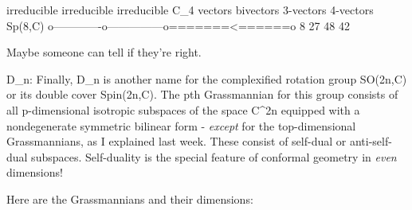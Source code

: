                            irreducible     irreducible    irreducible
C_{4}              vectors     bivectors       3-vectors      4-vectors
Sp(8,C)          o-------------o---------------o=======<======o
                 8            27              48             42
$$
    
Maybe someone can tell if they're right.  

D_{n}: Finally, D_{n} is another name for the complexified rotation group
SO(2n,C) or its double cover Spin(2n,C).  The pth Grassmannian for
this group consists of all p-dimensional isotropic subspaces of the
space C^{2n} equipped with a nondegenerate symmetric bilinear form -
\emph{except} for the top-dimensional Grassmannians, as I explained
last week.  These consist of self-dual or anti-self-dual subspaces.
Self-duality is the special feature of conformal geometry in \emph{even}
dimensions!

Here are the Grassmannians and their dimensions:

